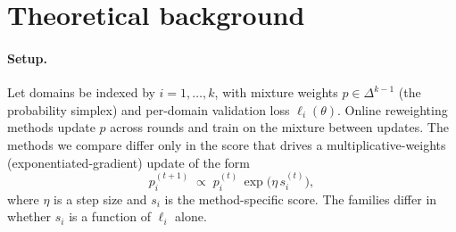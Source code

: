 \documentclass{article}
\begin{document}
\clearpage



\newpage

\appendix

\section{Theoretical background}
\label{app:theory}

\paragraph{Setup.} Let domains be indexed by $i=1,\dots,k$, with mixture weights $p\in\Delta^{k-1}$ (the probability simplex) and per-domain validation loss $\ell_i(\theta)$. Online reweighting methods update $p$ across rounds and train on the mixture between updates. The methods we compare differ only in the score that drives a multiplicative-weights (exponentiated-gradient) update of the form
\begin{equation}
p_i^{(t+1)} \;\propto\; p_i^{(t)} \, \exp\!\big(\eta \, s_i^{(t)}\big),
\label{eq:mw}
\end{equation}
where $\eta$ is a step size and $s_i$ is the method-specific score. The families differ in whether $s_i$ is a function of $\ell_i$ alone.
\end{document}

